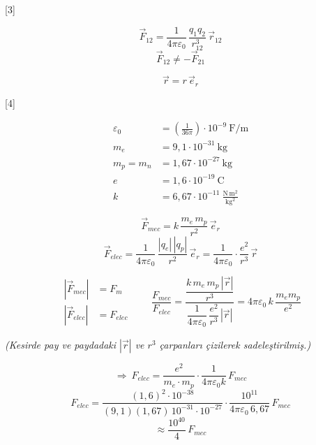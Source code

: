 \documentclass[11pt,a4paper]{article}
\begin{document}
[3]

\[ \vec F_{12} = \frac{1}{4\pi\varepsilon_0}\,\frac{q_1 q_2}{r_{12}^{3}}\,\vec r_{12} \]
\[ \vec F_{12} \neq -\vec F_{21} \]

\[ \vec r = r\,\vec e_r \]

[4]

\begin{align*}
\varepsilon_0 &= \left(\tfrac{1}{36\pi}\right)\cdot 10^{-9}\ \mathrm{F/m}\\
m_e &= 9{,}1\cdot 10^{-31}\ \mathrm{kg}\\
m_p = m_n &= 1{,}67\cdot 10^{-27}\ \mathrm{kg}\\
e &= 1{,}6\cdot 10^{-19}\ \mathrm{C}\\
k &= 6{,}67\cdot 10^{-11}\ \frac{\mathrm{N\,m^2}}{\mathrm{kg^2}}
\end{align*}

\[ \vec F_{mec} = k\,\frac{m_e\, m_p}{r^2}\,\vec e_r \]
\[ \vec F_{elec} = \frac{1}{4\pi\varepsilon_0}\,\frac{|q_e|\,|q_p|}{r^2}\,\vec e_r = \frac{1}{4\pi\varepsilon_0}\cdot\frac{e^2}{r^3}\,\vec r \]

\[ \begin{aligned} |\vec F_{mec}| &= F_m\\ |\vec F_{elec}| &= F_{elec} \end{aligned} \qquad \frac{F_{mec}}{F_{elec}} = \frac{\dfrac{k\,m_e\,m_p\,|\vec r|}{r^3}}{\dfrac{1}{4\pi\varepsilon_0}\,\dfrac{e^2}{r^3}\,|\vec r|} = 4\pi\varepsilon_0\,k\,\frac{m_e m_p}{e^2} \]

\noindent\textit{(Kesirde pay ve paydadaki $|\vec r|$ ve $r^3$ çarpanları çizilerek sadeleştirilmiş.)}

\[ \Rightarrow\ F_{elec} = \frac{e^2}{m_e\cdot m_p}\cdot\frac{1}{4\pi\varepsilon_0 k}\,F_{mec} \]
\[ F_{elec} = \frac{(1{,}6)^{2}\cdot 10^{-38}}{(9{,}1)(1{,}67)\,10^{-31}\cdot 10^{-27}}\cdot\frac{10^{11}}{4\pi\varepsilon_0\,6{,}67}\,F_{mec} \]
\[ \approx \frac{10^{40}}{4}\,F_{mec} \]
\end{document}
